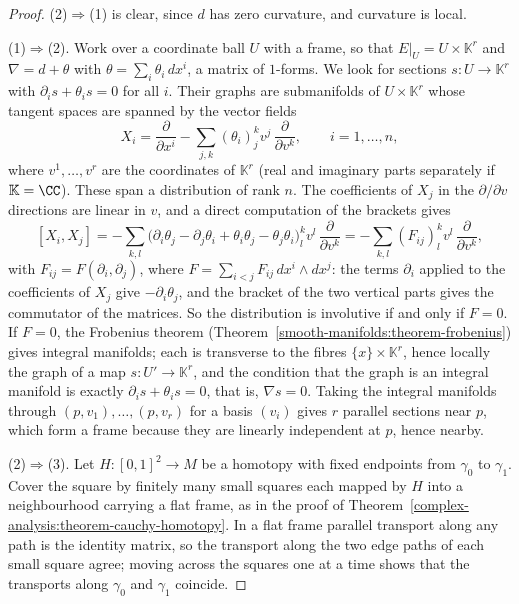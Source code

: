 \begin{proof}
(2)$\Rightarrow$(1) is clear, since $d$ has zero curvature, and curvature is local.

(1)$\Rightarrow$(2). Work over a coordinate ball $U$ with a frame, so that $E|_U = U \times \mathbb{K}^r$ and $\nabla = d + \theta$ with $\theta = \sum_i\theta_i\,dx^i$, a matrix of $1$-forms. We look
for sections $s \colon U \to \mathbb{K}^r$ with $\partial_is + \theta_is = 0$ for all $i$. Their graphs are submanifolds of $U \times \mathbb{K}^r$ whose tangent spaces are spanned by the
vector fields
\[
X_i = \frac{\partial}{\partial x^i} - \sum_{j,k}(\theta_i)^k_jv^j\,\frac{\partial}{\partial v^k}, \qquad i = 1, \ldots, n,
\]
where $v^1, \ldots, v^r$ are the coordinates of $\mathbb{K}^r$ (real and imaginary parts separately if $\mathbb{K} = \CC$). These span a distribution of rank $n$. The coefficients of
$X_j$ in the $\partial/\partial v$ directions are linear in $v$, and a direct computation of the brackets gives
\[
[X_i, X_j] = -\sum_{k,l}\bigl(\partial_i\theta_j - \partial_j\theta_i + \theta_i\theta_j - \theta_j\theta_i\bigr)^k_lv^l\,\frac{\partial}{\partial v^k} = -\sum_{k,l}(F_{ij})^k_lv^l\,\frac{\partial}{\partial v^k},
\]
with $F_{ij} = F(\partial_i, \partial_j)$, where $F = \sum_{i<j}F_{ij}\,dx^i \wedge dx^j$: the terms $\partial_i$ applied to the coefficients of $X_j$ give $-\partial_i\theta_j$, and the
bracket of the two vertical parts gives the commutator of the matrices. So the distribution is involutive if and only if $F = 0$. If $F = 0$, the Frobenius theorem
(Theorem~\ref{smooth-manifolds:theorem-frobenius}) gives integral manifolds; each is transverse to the fibres $\{x\} \times \mathbb{K}^r$, hence locally the graph of a map $s \colon U' \to \mathbb{K}^r$, and the condition
that the graph is an integral manifold is exactly $\partial_is + \theta_is = 0$, that is, $\nabla s = 0$. Taking the integral manifolds through $(p, v_1), \ldots, (p, v_r)$ for a basis $(v_i)$ gives $r$ parallel
sections near $p$, which form a frame because they are linearly independent at $p$, hence nearby.

(2)$\Rightarrow$(3). Let $H \colon [0,1]^2 \to M$ be a homotopy with fixed endpoints from $\gamma_0$ to $\gamma_1$. Cover the square by finitely many small squares each mapped by $H$ into a neighbourhood
carrying a flat frame, as in the proof of Theorem~\ref{complex-analysis:theorem-cauchy-homotopy}. In a flat frame parallel transport along any path is the identity matrix, so the transport along the two
edge paths of each small square agree; moving across the squares one at a time shows that the transports along $\gamma_0$ and $\gamma_1$ coincide.


\end{proof}
